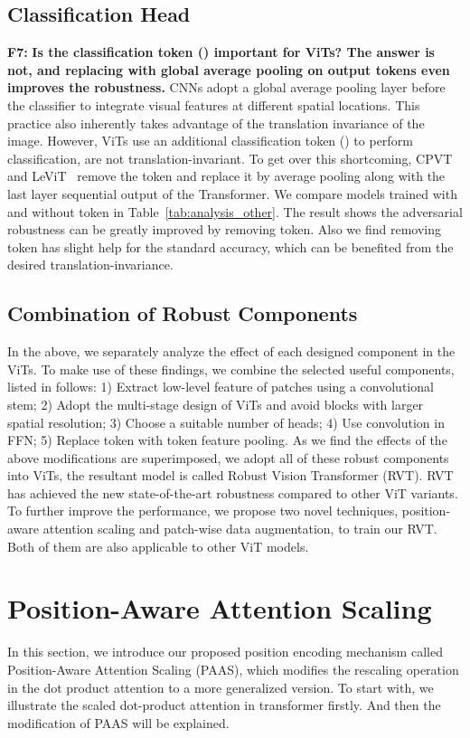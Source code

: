 \documentclass[10pt,twocolumn,letterpaper]{article}
\begin{document}
\subsection{Classification Head}
\textbf{F7: } \textbf{Is the classification token () important for ViTs? The answer is not, and replacing  with global average pooling on output tokens even improves the robustness. } CNNs adopt a global average pooling layer before the classifier to integrate visual features at different spatial locations. This practice also inherently takes advantage of the translation invariance of the image. However, ViTs use an additional classification token () to perform classification, are not translation-invariant. To get over this shortcoming, CPVT~\cite{chu2021we} and LeViT~\cite{graham2021levit} remove the  token and replace it by average pooling along with the last layer sequential output of the Transformer. We compare models trained with and without  token in Table~\ref{tab:analysis_other}. The result shows the adversarial robustness can be greatly improved by removing  token. Also we find removing  token has slight help for the standard accuracy, which can be benefited from the desired translation-invariance.

\subsection{Combination of Robust Components}
\label{sec:2.5}
In the above, we separately analyze the effect of each designed component in the ViTs. To make use of these findings, we combine the selected useful components, listed in follows: 1) Extract low-level feature of patches using a convolutional stem; 2) Adopt the multi-stage design of ViTs and avoid blocks with larger spatial resolution; 3) Choose a suitable number of heads; 4) Use convolution in FFN; 5) Replace  token with token feature pooling. As we find the effects of the above modifications are superimposed, we adopt all of these robust components into ViTs, the resultant model is called Robust Vision Transformer (RVT). RVT has achieved the new state-of-the-art robustness compared to other ViT variants. To further improve the performance, we propose two novel techniques, position-aware attention scaling and patch-wise data augmentation, to train our RVT. Both of them are also applicable to other ViT models.

\section{Position-Aware Attention Scaling}
In this section, we introduce our proposed position encoding mechanism called Position-Aware Attention Scaling (PAAS), which modifies the rescaling operation in the dot product attention to a more generalized version. To start with, we illustrate the scaled dot-product attention in transformer firstly. And then the modification of PAAS will be explained. 
\end{document}
